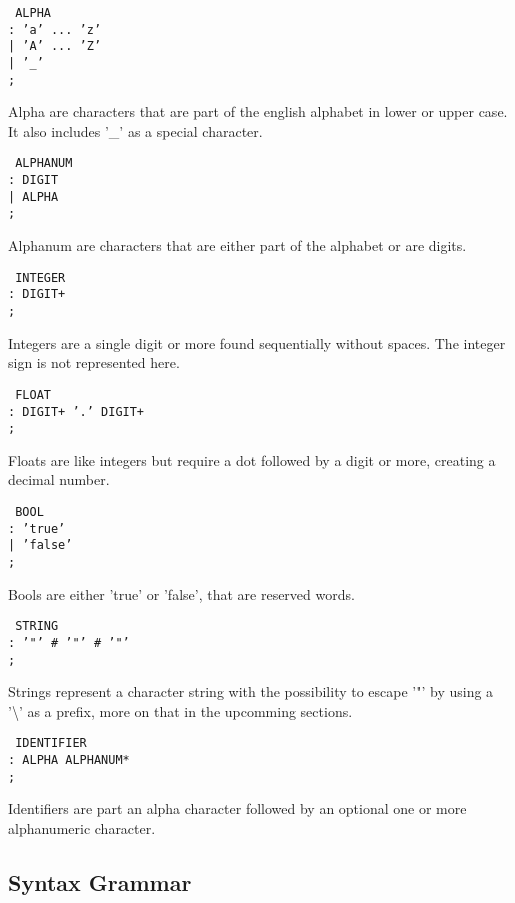 \texttt{
    ALPHA\\
        \tab: 'a' ... 'z'\\
        \tab| 'A' ... 'Z'\\
        \tab| '\_'\\
        \tab;
}

Alpha are characters that are part of the english alphabet in lower or upper case. It also includes '\_' as a special character.

\texttt{
    ALPHANUM\\
        \tab: DIGIT\\
        \tab| ALPHA\\
        \tab;
}

Alphanum are characters that are either part of the alphabet or are digits.

\texttt{
    INTEGER\\
        \tab: DIGIT+\\
        \tab;
}

Integers are a single digit or more found sequentially without spaces. The integer sign is not represented here.

\texttt{
    FLOAT\\
        \tab: DIGIT+ '.' DIGIT+\\
        \tab;
}

Floats are like integers but require a dot followed by a digit or more, creating a decimal number.

\texttt{
    BOOL\\
        \tab: 'true'\\
        \tab| 'false'\\
        \tab;
}

Bools are either 'true' or 'false', that are reserved words.

\texttt{
    STRING\\
        \tab: '"' \# '"' \# '"'\\
        \tab;
}

Strings represent a character string with the possibility to escape '"' by using a '\textbackslash' as a prefix, more on that in the upcomming sections.

\texttt{
    IDENTIFIER\\
        \tab: ALPHA ALPHANUM*\\
        \tab;
}

Identifiers are part an alpha character followed by an optional one or more alphanumeric character.

\subsection{Syntax Grammar}

